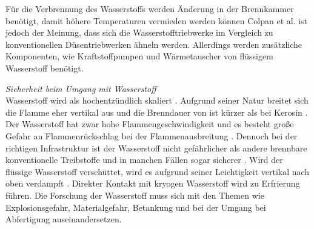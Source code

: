 Für die Verbrennung des Wasserstoffs werden Änderung in der Brennkammer benötigt, damit höhere Temperaturen vermieden werden können \cite{khandelwal2013hydrogen}
Colpan et al. \cite{colpan2022fuel} ist jedoch der Meinung, dass sich die Wasserstofftriebwerke im Vergleich zu konventionellen Düsentriebwerken ähneln werden. 
Allerdings werden zusätzliche Komponenten, wie Kraftstoffpumpen und Wärmetauscher von flüssigem Wasserstoff benötigt.






\textit{Sicherheit beim Umgang mit Wasserstoff}\\
Wasserstoff wird als hochentzündlich skaliert \cite{dalmia2022powering}. Aufgrund seiner Natur breitet sich die Flamme eher 
vertikal aus und die Brenndauer von  ist kürzer als bei Kerosin \cite{colpan2022fuel}.
Der Wasserstoff hat zwar hohe Flammengeschwindigkeit und es besteht große Gefahr an Flammenrückschlag bei der Flammenausbreitung \cite{khandelwal2013hydrogen}.
Dennoch bei der richtigen Infrastruktur ist der Wasserstoff nicht gefährlicher als andere brennbare konventionelle Treibstoffe und in manchen 
Fällen sogar sicherer \cite{khandelwal2013hydrogen}. 
Wird der flüssige Wasserstoff verschüttet, wird es aufgrund seiner Leichtigkeit vertikal nach oben verdampft \cite{colpan2022fuel}. 
Direkter Kontakt mit kryogen Wasserstoff wird zu Erfrierung führen.
Die Forschung der Wasserstoff muss sich mit den Themen wie Explosionsgefahr, Materialgefahr, Betankung und 
bei der Umgang bei Abfertigung auseinandersetzen. 


